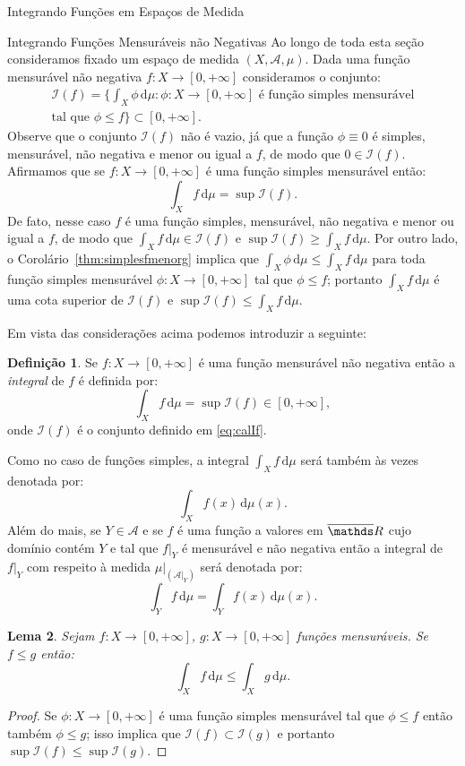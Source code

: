 \documentclass[oneside,final,11pt]{amsbook}
\newcommand{\R}{\mathds R}
\newcommand{\dd}{\mathrm d}
\theoremstyle{remark}\newtheorem{exercise}{Exercício}[chapter]
\theoremstyle{remark}\newtheorem{*exercise}[exercise]{\hbox to 0pt{\hskip 0pt minus 1fil*}Exercício}
\theoremstyle{definition}\newtheorem{exdefin}{Definição}[chapter]
\theoremstyle{plain}\newtheorem{teo}{Teorema}[section]
\theoremstyle{plain}\newtheorem{lem}[teo]{Lema}
\theoremstyle{plain}\newtheorem{prop}[teo]{Proposição}
\theoremstyle{plain}\newtheorem{cor}[teo]{Corolário}
\theoremstyle{definition}\newtheorem{defin}[teo]{Definição}
\theoremstyle{remark}\newtheorem{rem}[teo]{Observação}
\theoremstyle{definition}\newtheorem{notation}[teo]{Notação}
\theoremstyle{definition}\newtheorem{convention}[teo]{Convenção}
\theoremstyle{definition}\newtheorem{example}[teo]{Exemplo}
\numberwithin{section}{chapter}
\numberwithin{equation}{section}
\begin{document}
\begin{chapter}{Integrando Funções em Espaços de Medida}
\begin{section}{Integrando Funções Mensuráveis não Negativas}
Ao longo de toda esta seção consideramos fixado um espaço de medida $(X,\mathcal A,\mu)$.
Dada uma função mensurável não negativa $f:X\to[0,+\infty]$ consideramos o conjunto:
\begin{multline}\label{eq:calIf}
\mathcal I(f)=\Big\{\int_X\phi\,\dd\mu:
\text{$\phi:X\to[0,+\infty]$ é função simples mensurável}\\
\text{tal que $\phi\le f$}\Big\}\subset[0,+\infty].
\end{multline}
Observe que o conjunto $\mathcal I(f)$ não é vazio, já que a função $\phi\equiv0$
é simples, mensurável, não negativa e menor ou igual a $f$, de modo que $0\in\mathcal I(f)$.
Afirmamos que se $f:X\to[0,+\infty]$ é uma função simples mensurável então:
\[\int_Xf\,\dd\mu=\sup\mathcal I(f).\]
De fato, nesse caso $f$ é uma função simples, mensurável, não negativa e menor ou igual a $f$,
de modo que $\int_Xf\,\dd\mu\in\mathcal I(f)$ e $\sup\mathcal I(f)\ge\int_Xf\,\dd\mu$.
Por outro lado, o Corolário~\ref{thm:simplesfmenorg} implica que $\int_X\phi\,\dd\mu\le\int_Xf\,\dd\mu$
para toda função simples mensurável $\phi:X\to[0,+\infty]$ tal que $\phi\le f$; portanto
$\int_Xf\,\dd\mu$ é uma cota superior de $\mathcal I(f)$ e $\sup\mathcal I(f)\le\int_Xf\,\dd\mu$.

Em vista das considerações acima podemos introduzir a seguinte:
\begin{defin}
Se $f:X\to[0,+\infty]$ é uma função mensurável não negativa então a
{\em integral\/}%
de $f$ é definida por:
\index[simbolos]{$\int_Xf\,\dd\mu$}\[\int_Xf\,\dd\mu=\sup\mathcal I(f)\in[0,+\infty],\]
onde $\mathcal I(f)$ é o conjunto definido em \eqref{eq:calIf}.
\end{defin}
Como no caso de funções simples, a integral $\int_Xf\,\dd\mu$ será também às vezes denotada por:
\index[simbolos]{$\int_Xf(x)\,\dd\mu(x)$}\[\int_Xf(x)\,\dd\mu(x).\]
Além do mais, se $Y\in\mathcal A$ e se $f$ é uma função a valores em $\overline\R$
cujo domínio contém $Y$ e tal que
$f\vert_Y$ é mensurável e não negativa então a integral de $f\vert_Y$ com respeito à medida
$\mu\vert_{(\mathcal A\vert_Y)}$ será denotada por:
\[\int_Yf\,\dd\mu=\int_Yf(x)\,\dd\mu(x).\]

\begin{lem}\label{thm:intmensnnegcresce}
Sejam $f:X\to[0,+\infty]$, $g:X\to[0,+\infty]$ funções mensuráveis. Se $f\le g$ então:
\[\int_Xf\,\dd\mu\le\int_Xg\,\dd\mu.\]
\end{lem}
\begin{proof}
Se $\phi:X\to[0,+\infty]$ é uma função simples mensurável tal que $\phi\le f$ então também $\phi\le g$;
isso implica que $\mathcal I(f)\subset\mathcal I(g)$ e portanto $\sup\mathcal I(f)\le\sup\mathcal I(g)$.
\end{proof}


\end{section}
\end{chapter}
\end{document}
